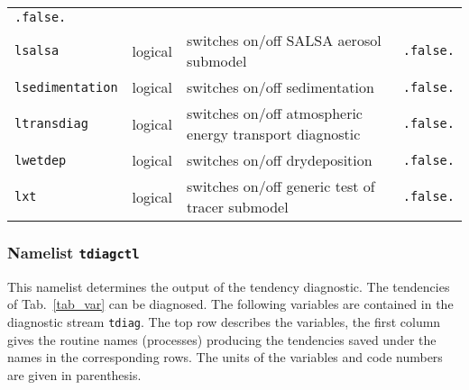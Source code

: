 \begin{longtable}{l@{\extracolsep\fill}lp{5.0cm}p{3.0cm}}
  {\tt .false.} \\
{\tt lsalsa}\index{namelist variables!lsalsa}
 & logical & switches on/off SALSA aerosol submodel &
  {\tt .false.} \\
{\tt lsedimentation}\index{namelist variables!lsedimentation}
 & logical & switches on/off sedimentation &
  {\tt .false.} \\
{\tt ltransdiag}\index{namelist variables!ltransdiag}
 & logical & switches on/off atmospheric energy
  transport diagnostic & {\tt .false.} \\
{\tt lwetdep}\index{namelist variables!lwetdep}
 & logical & switches on/off drydeposition &
  {\tt .false.} \\
{\tt lxt}\index{namelist variables!lxt}
 & logical & switches on/off generic test of tracer submodel &
  {\tt .false.} \\\hline 
\end{longtable}


\subsubsection{Namelist {\tt tdiagctl}}\label{sectdiagctl}

This namelist determines the output of the tendency diagnostic.
The tendencies of Tab.~\ref{tab_var} can be diagnosed.
The following variables are contained in the diagnostic stream {\tt tdiag}.
         The top row describes the variables, the first column
         gives the routine names (processes) producing the tendencies
         saved under the names in the corresponding rows.
  The units of the variables and code numbers are given in
  parenthesis.

